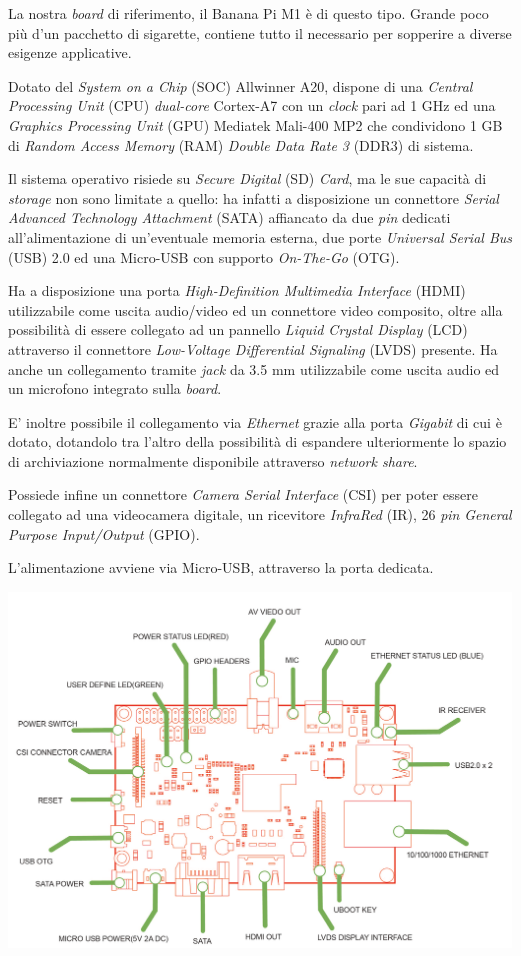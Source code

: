 La nostra \emph{board} di riferimento, il Banana Pi M1 è di questo tipo. Grande 
poco più d'un pacchetto di sigarette, contiene tutto il necessario per 
sopperire a diverse esigenze applicative.

Dotato del \emph{System on a Chip} (SOC) Allwinner A20, dispone di una 
\textit{Central Processing Unit} (CPU) \emph{dual-core} Cortex-A7 con un 
\textit{clock} pari ad 1 GHz ed una \textit{Graphics Processing Unit} (GPU) 
Mediatek Mali-400 MP2 che condividono 1 GB di \textit{Random Access Memory} 
(RAM) \textit{Double Data Rate 3} (DDR3) di sistema.

Il sistema operativo risiede su \textit{Secure Digital} (SD) \textit{Card}, ma 
le sue capacità di \emph{storage} non sono limitate a quello: ha infatti a 
disposizione un connettore \textit{Serial Advanced Technology Attachment} 
(SATA) affiancato da due \emph{pin} dedicati all'alimentazione di un'eventuale 
memoria esterna, due porte \textit{Universal Serial Bus} (USB) 2.0 ed una 
Micro-USB con supporto \textit{On-The-Go} (OTG).

Ha a disposizione una porta \textit{High-Definition Multimedia Interface} 
(HDMI) utilizzabile come uscita audio/video ed un connettore video composito, 
oltre alla possibilità di essere collegato ad un pannello \textit{Liquid 
Crystal Display} (LCD) attraverso il connettore \textit{Low-Voltage 
Differential Signaling} (LVDS) presente. Ha anche un collegamento tramite 
\emph{jack} da 3.5 mm utilizzabile come uscita audio ed un microfono integrato 
sulla \emph{board}.

E' inoltre possibile il collegamento via \textit{Ethernet} grazie alla porta 
\textit{Gigabit} di cui è dotato, dotandolo tra l'altro della possibilità di 
espandere ulteriormente lo spazio di archiviazione normalmente disponibile 
attraverso \emph{network share}.

Possiede infine un connettore \textit{Camera Serial Interface} (CSI) per poter 
essere collegato ad una videocamera digitale, un ricevitore \textit{InfraRed} 
(IR), 26 \textit{pin} \textit{General Purpose Input/Output} (GPIO).

L'alimentazione avviene via Micro-USB, attraverso la porta dedicata.

\includegraphics[width=1\textwidth]{Figures/bananapi_schema.png}
